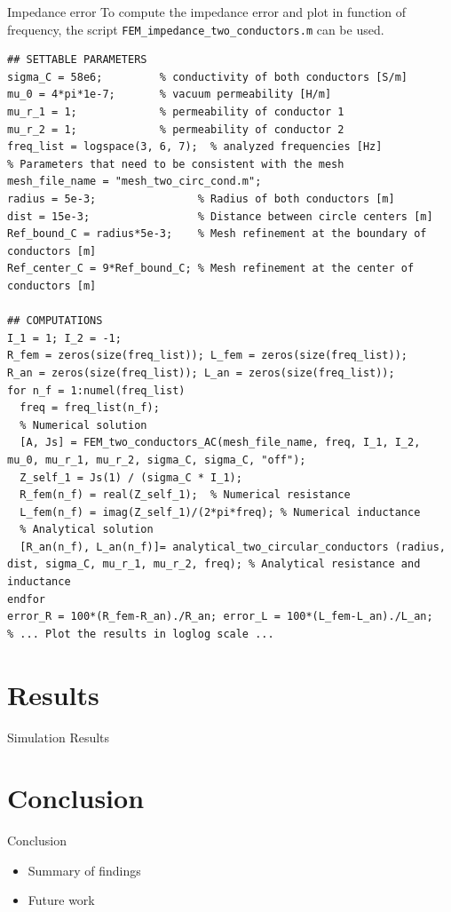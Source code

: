 \documentclass[aspectratio=54,xcolor=dvipsnames]{beamer}
\begin{document}
\begin{frame}[fragile]{Impedance error}
\scriptsize
To compute the impedance error and plot in function of frequency, the script \texttt{FEM\_impedance\_two\_conductors.m} can be used. 
\begin{lstlisting}[firstnumber=1]
## SETTABLE PARAMETERS
sigma_C = 58e6;         % conductivity of both conductors [S/m]
mu_0 = 4*pi*1e-7;       % vacuum permeability [H/m]
mu_r_1 = 1;             % permeability of conductor 1
mu_r_2 = 1;             % permeability of conductor 2
freq_list = logspace(3, 6, 7);  % analyzed frequencies [Hz]
% Parameters that need to be consistent with the mesh 
mesh_file_name = "mesh_two_circ_cond.m";
radius = 5e-3;                % Radius of both conductors [m]
dist = 15e-3;                 % Distance between circle centers [m]
Ref_bound_C = radius*5e-3;    % Mesh refinement at the boundary of conductors [m]
Ref_center_C = 9*Ref_bound_C; % Mesh refinement at the center of conductors [m]

## COMPUTATIONS
I_1 = 1; I_2 = -1;
R_fem = zeros(size(freq_list)); L_fem = zeros(size(freq_list));
R_an = zeros(size(freq_list)); L_an = zeros(size(freq_list));
for n_f = 1:numel(freq_list)
  freq = freq_list(n_f);
  % Numerical solution
  [A, Js] = FEM_two_conductors_AC(mesh_file_name, freq, I_1, I_2, mu_0, mu_r_1, mu_r_2, sigma_C, sigma_C, "off");
  Z_self_1 = Js(1) / (sigma_C * I_1);
  R_fem(n_f) = real(Z_self_1);  % Numerical resistance
  L_fem(n_f) = imag(Z_self_1)/(2*pi*freq); % Numerical inductance
  % Analytical solution
  [R_an(n_f), L_an(n_f)]= analytical_two_circular_conductors (radius, dist, sigma_C, mu_r_1, mu_r_2, freq); % Analytical resistance and inductance
endfor
error_R = 100*(R_fem-R_an)./R_an; error_L = 100*(L_fem-L_an)./L_an;
% ... Plot the results in loglog scale ...
\end{lstlisting}
\end{frame}

\section{Results}
\begin{frame}{Simulation Results}

\end{frame}

\section{Conclusion}
\begin{frame}{Conclusion}
    \begin{itemize}
        \item Summary of findings
        \item Future work
    \end{itemize}
\end{frame}
\end{document}
